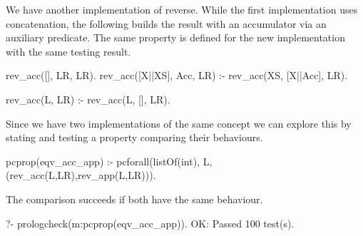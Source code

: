 \documentclass[11pt,twoside]{article}
\begin{document}
We have another implementation of reverse.
While the first implementation uses concatenation, the following
builds the result with an accumulator via an auxiliary predicate.
%
%
The same property is defined for the new implementation with the same
testing result.
\begin{yapcode}
 rev_acc([], LR, LR).
 rev_acc([X||XS], Acc, LR) :- rev_acc(XS, [X||Acc], LR).

 rev_acc(L, LR) :- rev_acc(L, [], LR).
\end{yapcode}


Since we have two implementations of the same concept we can explore
this by 
stating and testing a property comparing their behaviours.
%
\begin{yapcode}
 pcprop(eqv_acc_app) :-
   pcforall(listOf(int), L, (rev_acc(L,LR),rev_app(L,LR))).
\end{yapcode}
The comparison succeeds if both have the same behaviour.
%
\begin{yapcode}
   ?- prologcheck(m:pcprop(eqv_acc_app)).
 OK: Passed 100 test(s).
\end{yapcode}

\end{document}
